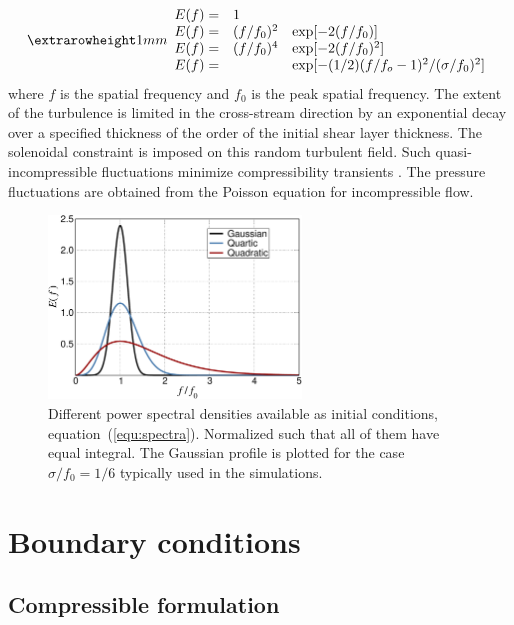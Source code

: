 \begin{equation}\setlength{\extrarowheight}{1mm}
\begin{array}{lll}
  E(f) = &1& \\
  E(f) = &(f/f_0)^2 &\exp[-2 (f/f_0)]\\
  E(f) = &(f/f_0)^4 &\exp[-2 (f/f_0)^2]\\
  E(f) = & & \exp[-(1/2)(f/f_o-1)^2/(\sigma/f_0)^2]
\end{array}
\label{equ:spectra}
\end{equation}
where $f$ is the spatial frequency and $f_0$ is the peak spatial frequency. The
extent of the turbulence is limited in the cross-stream direction by an
exponential decay over a specified thickness of the order of the initial shear
layer thickness. The solenoidal constraint is imposed on this random turbulent
field. Such quasi-incompressible fluctuations minimize compressibility
transients \cite{Erlebacher:1990}. The pressure fluctuations are obtained from
the Poisson equation for incompressible flow.

\begin{figure}
\includegraphics[clip,width=0.6\textwidth]{figs/Spectra}
\caption{Different power spectral densities available as initial conditions,
  equation~(\ref{equ:spectra}). Normalized such that all of them have equal
  integral. The Gaussian profile is plotted for the case $\sigma/f_0=1/6$
  typically used in the simulations.}\label{fig:eq-spc}
\end{figure}

\section{Boundary conditions}

\subsection{Compressible formulation}

